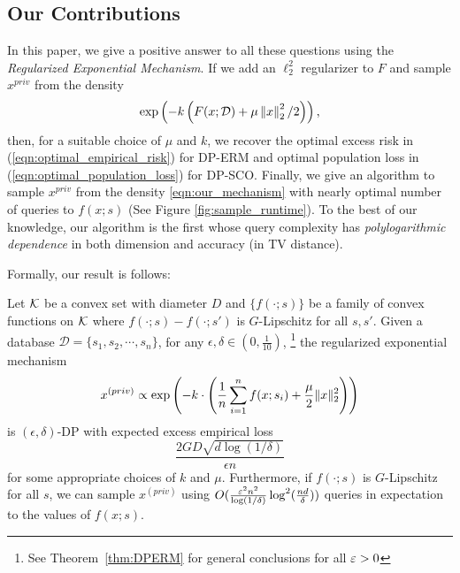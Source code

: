\subsection{Our Contributions}
In this paper, we give a positive answer to all these questions using the \emph{Regularized Exponential Mechanism}. If we add an $\ell_2^2$ regularizer to $F$ and sample $x^{priv}$ from the density 
\begin{equation}
\label{eqn:our_mechanism}
\exp\left(-k\left( F(x;\mathcal D)+\mu \left\lVert x\right\rVert_2^2/2\right)\right),
\end{equation}
then, for a suitable choice of $\mu$ and $k$, we recover the optimal excess risk in (\ref{eqn:optimal_empirical_risk}) for DP-ERM and optimal population loss in (\ref{eqn:optimal_population_loss}) for DP-SCO. Finally, we give an algorithm to sample $x^{priv}$ from the density \eqref{eqn:our_mechanism} with nearly optimal number of queries to $f(x;s)$ (See Figure \ref{fig:sample_runtime}). To the best of our knowledge, our algorithm is the first whose query complexity has \emph{polylogarithmic dependence} in both dimension and accuracy (in TV distance).



Formally, our result is follows:
\begin{theorem}
Let $\mathcal K$ be a convex set with diameter $D$ and $\{f(\cdot;s)\}$
be a family of convex functions on $\mathcal K$ where $f(\cdot;s)-f(\cdot;s')$ is $G$-Lipschitz for all $s,s'$. Given a
database $\mathcal{D}=\{s_{1},s_{2},\cdots,s_{n}\}$, for any $\epsilon,\delta\in(0,\frac{1}{10})$,
\footnote{See Theorem~\ref{thm:DPERM} for general conclusions for all $\varepsilon>0$}
the regularized exponential mechanism 
\[
x^{(priv)}\propto\exp\left(-k\cdot\left(\frac{1}{n}\sum_{i=1}^{n}f(x;s_{i})+\frac{\mu}{2}\|x\|_{2}^{2}\right)\right)
\]
is $(\epsilon,\delta)$-DP with expected excess empirical loss
\[
\frac{2GD\sqrt{d\log(1/\delta)}}{\epsilon n}
\]
for some appropriate choices of $k$ and $\mu$. Furthermore, if $f(\cdot;s)$ is $G$-Lipschitz for all $s$, 
we can sample $x^{(priv)}$ using $O(\frac{\varepsilon^2n^2}{\log(1/\delta)}\log^2(\frac{nd}{\delta}))$ queries in expectation to the values of $f(x;s)$.
\end{theorem}

